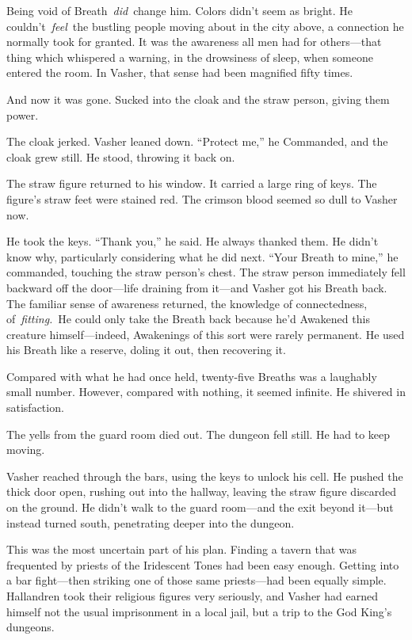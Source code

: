 Being void of Breath~\textit{did}~change him. Colors didn’t seem as bright. He couldn’t~\textit{feel}~the bustling people moving about in the city above, a connection he normally took for granted. It was the awareness all men had for others—that thing which whispered a warning, in the drowsiness of sleep, when someone entered the room. In Vasher, that sense had been magnified fifty times.

And now it was gone. Sucked into the cloak and the straw person, giving them power.

The cloak jerked. Vasher leaned down. “Protect me,” he Commanded, and the cloak grew still. He stood, throwing it back on.

The straw figure returned to his window. It carried a large ring of keys. The figure’s straw feet were stained red. The crimson blood seemed so dull to Vasher now.

He took the keys. “Thank you,” he said. He always thanked them. He didn’t know why, particularly considering what he did next. “Your Breath to mine,” he commanded, touching the straw person’s chest. The straw person immediately fell backward off the door—life draining from it—and Vasher got his Breath back. The familiar sense of awareness returned, the knowledge of connectedness, of~\textit{fitting.}~He could only take the Breath back because he’d Awakened this creature himself—indeed, Awakenings of this sort were rarely permanent. He used his Breath like a reserve, doling it out, then recovering it.

Compared with what he had once held, twenty-five Breaths was a laughably small number. However, compared with nothing, it seemed infinite. He shivered in satisfaction.

The yells from the guard room died out. The dungeon fell still. He had to keep moving.

Vasher reached through the bars, using the keys to unlock his cell. He pushed the thick door open, rushing out into the hallway, leaving the straw figure discarded on the ground. He didn’t walk to the guard room—and the exit beyond it—but instead turned south, penetrating deeper into the dungeon.

This was the most uncertain part of his plan. Finding a tavern that was frequented by priests of the Iridescent Tones had been easy enough. Getting into a bar fight—then striking one of those same priests—had been equally simple. Hallandren took their religious figures very seriously, and Vasher had earned himself not the usual imprisonment in a local jail, but a trip to the God King’s dungeons.

